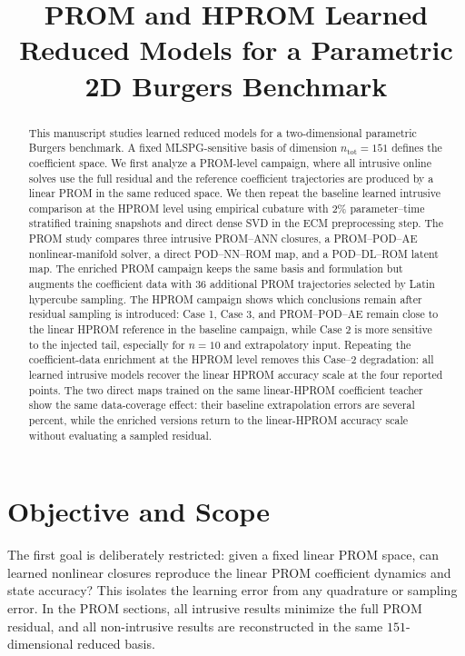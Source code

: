 \documentclass[11pt]{article}
\title{PROM and HPROM Learned Reduced Models for a Parametric 2D Burgers Benchmark}
\author{}
\date{}
\begin{document}
\maketitle

\begin{abstract}
This manuscript studies learned reduced models for a two-dimensional parametric Burgers benchmark.  A fixed
MLSPG-sensitive basis of dimension \(n_{\mathrm{tot}}=151\) defines the coefficient space.  We first analyze a
PROM-level campaign, where all intrusive online solves use the full residual and the reference coefficient
trajectories are produced by a linear PROM in the same reduced space.  We then repeat the baseline learned
intrusive comparison at the HPROM level using empirical cubature with 2\% parameter--time stratified training
snapshots and direct dense SVD in the ECM preprocessing step.  The PROM study compares three intrusive PROM--ANN
closures, a PROM--POD--AE nonlinear-manifold solver, a direct POD--NN--ROM map, and a POD--DL--ROM latent map.
The enriched PROM campaign keeps the same basis and formulation but augments the coefficient data with 36
additional PROM trajectories selected by Latin hypercube sampling.  The HPROM campaign shows which conclusions
remain after residual sampling is introduced: Case 1, Case 3, and PROM--POD--AE remain close to the linear HPROM
reference in the baseline campaign, while Case 2 is more sensitive to the injected tail, especially for \(n=10\)
and extrapolatory input.  Repeating the coefficient-data enrichment at the HPROM level removes this Case--2
degradation: all learned intrusive models recover the linear HPROM accuracy scale at the four reported points.
The two direct maps trained on the same linear-HPROM coefficient teacher show the same data-coverage effect: their
baseline extrapolation errors are several percent, while the enriched versions return to the linear-HPROM accuracy
scale without evaluating a sampled residual.
\end{abstract}

\section{Objective and Scope}
The first goal is deliberately restricted: given a fixed linear PROM space, can learned nonlinear closures reproduce
the linear PROM coefficient dynamics and state accuracy?  This isolates the learning error from any quadrature or
sampling error.  In the PROM sections, all intrusive results minimize the full PROM residual, and all non-intrusive
results are reconstructed in the same \(151\)-dimensional reduced basis.
\end{document}
